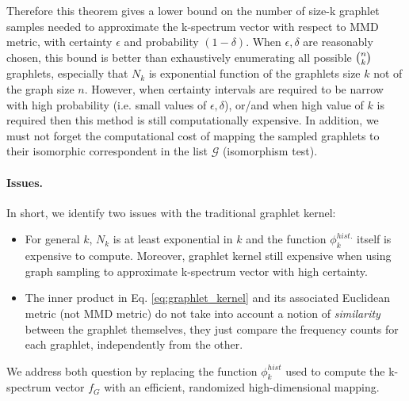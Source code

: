 Therefore this theorem gives a lower bound on the number of size-k graphlet samples needed to approximate the k-spectrum vector with respect to MMD metric, with certainty $\epsilon$ and probability $(1-\delta)$. When $\epsilon, \delta$ are reasonably chosen, this bound is better than exhaustively enumerating all possible $\tbinom{n}{k}$ graphlets, especially that $N_k$ is exponential function of the graphlets size $k$ not of the graph size $n$. However, when certainty intervals are required to be narrow with high probability (i.e. small values of $\epsilon, \delta$), or/and when high value of $k$ is required then this method is still computationally expensive. In addition, we must not forget the computational cost of mapping the sampled graphlets to their isomorphic correspondent in the list $\mathcal{G}$ (isomorphism test). 

\paragraph{Issues.} In short, we identify two issues with the traditional graphlet kernel:
\begin{itemize}
\item For general $k$, $N_k$ is at least exponential in $k$ and the function $\phi_k^{hist.}$ itself is expensive to compute. Moreover, graphlet kernel still expensive when using graph sampling to approximate k-spectrum vector with high certainty.
\item The inner product in Eq. \ref{eq:graphlet_kernel} and its associated Euclidean metric (not MMD metric) do not take into account a notion of \emph{similarity} between the graphlet themselves, they just compare the frequency counts for each graphlet, independently from the other.
\end{itemize}
We address both question by replacing the function $\phi_k^{hist}$ used to compute the k-spectrum vector $f_G$ with an efficient, randomized high-dimensional mapping.

